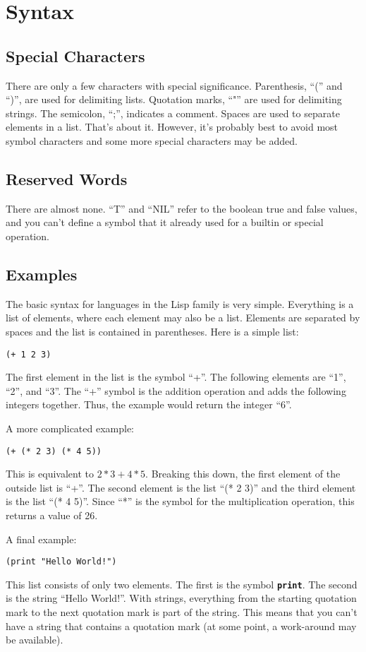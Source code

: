 \documentclass[10pt, openany]{book}
\newcommand{\operation}[1]{\textbf{\texttt{#1}}}
\begin{document}
\section{Syntax}

\subsection{Special Characters}
There are only a few characters with special significance.  Parenthesis, ``('' and ``)'', are used for delimiting lists.  Quotation marks, ``"'' are used for delimiting strings.  The semicolon, ``;'', indicates a comment.  Spaces are used to separate elements in a list.  That's about it.  However, it's probably best to avoid most symbol characters and some more special characters may be added.

\subsection{Reserved Words}
There are almost none.  ``T'' and ``NIL'' refer to the boolean true and false values, and you can't define a symbol that it already used for a builtin or special operation.

\subsection{Examples}
The basic syntax for languages in the Lisp family is very simple.  Everything is a list of elements, where each element may also be a list.  Elements are separated by spaces and the list is contained in parentheses.  Here is a simple list:
\lstset{language=Lisp}
\begin{lstlisting}
(+ 1 2 3)
\end{lstlisting}
The first element in the list is the symbol ``+''.  The following elements are ``1'', ``2'', and ``3''.  The ``+'' symbol is the addition operation and adds the following integers together.  Thus, the example would return the integer ``6''.

A more complicated example:
\begin{lstlisting}
(+ (* 2 3) (* 4 5))
\end{lstlisting}
This is equivalent to $2*3+4*5$.  Breaking this down, the first element of the outside list is ``+''.  The second element is the list ``(* 2 3)'' and the third element is the list ``(* 4 5)''.  Since ``*'' is the symbol for the multiplication operation, this returns a value of 26.

A final example:
\begin{lstlisting}
(print "Hello World!")
\end{lstlisting}
This list consists of only two elements.  The first is the symbol \operation{print}.  The second is the string ``Hello World!''.  With strings, everything from the starting quotation mark to the next quotation mark is part of the string.  This means that you can't have a string that contains a quotation mark (at some point, a work-around may be available).
\end{document}
